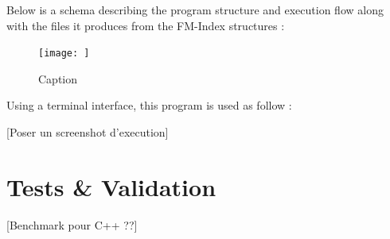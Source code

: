 Below is a schema describing the program structure and execution flow along with the files it produces from the FM-Index structures :

\begin{figure}
    \centering
    \texttt{[image: ]}
    \caption{Caption}
    \label{fig:my_label}
\end{figure}


Using a terminal interface, this program is used as follow :

[Poser un screenshot d'execution]


\section{Tests \& Validation}

[Benchmark pour C++ ??]